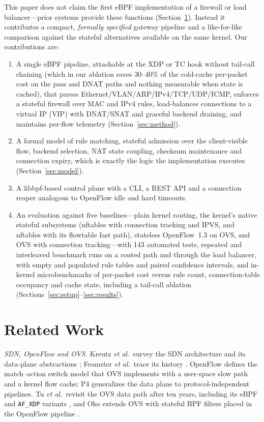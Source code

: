 \documentclass[conference]{IEEEtran}
\begin{document}
This paper does not claim the first eBPF implementation of a firewall or load
balancer---prior systems provide these functions (Section~\ref{sec:related}). Instead it
contributes a compact, \emph{formally specified} gateway pipeline and a
like-for-like comparison against the stateful alternatives available on the
same kernel. Our contributions are:
\begin{enumerate}
\item A single eBPF pipeline, attachable at the XDP or TC hook without
tail-call chaining (which in our ablation saves 30--40\% of the cold-cache
per-packet cost on the pass and DNAT paths and nothing measurable when state
is cached), that parses Ethernet/VLAN/ARP/IPv4/TCP/UDP/ICMP, enforces
a stateful firewall over MAC and IPv4 rules, load-balances connections to a
virtual IP (VIP) with DNAT/SNAT and graceful backend draining, and maintains
per-flow telemetry (Section~\ref{sec:method}).
\item A formal model of rule matching, stateful admission over the
client-visible flow, backend selection, NAT state coupling, checksum
maintenance and connection expiry, which is exactly the logic the
implementation executes (Section~\ref{sec:model}).
\item A libbpf-based control plane with a CLI, a REST API and a connection
reaper analogous to OpenFlow idle and hard timeouts.
\item An evaluation against five baselines---plain kernel routing, the
kernel's native stateful subsystems (nftables with connection tracking and
IPVS, and nftables with its flowtable fast path), stateless OpenFlow~1.3 on
OVS, and OVS with connection tracking---with 143 automated tests, repeated
and interleaved benchmark runs on a routed path and through the load
balancer, with empty and populated rule tables and paired confidence
intervals, and in-kernel
microbenchmarks of per-packet cost versus rule count, connection-table
occupancy and cache state, including a tail-call ablation (Sections~\ref{sec:setup}--\ref{sec:results}).
\end{enumerate}

\section{Related Work}
\label{sec:related}
\textit{SDN, OpenFlow and OVS.} Kreutz \textit{et al.}\ survey the SDN
architecture and its data-plane abstractions \cite{kreutz2015sdn}; Feamster
\textit{et al.}\ trace its history \cite{feamster2014road}. OpenFlow
\cite{mckeown2008openflow} defines the match--action switch model that OVS
\cite{pfaff2015ovs} implements with a user-space slow path and a kernel flow
cache; P4 \cite{bosshart2014p4} generalizes the data plane to
protocol-independent pipelines. Tu \textit{et al.}\ revisit the OVS data path
after ten years, including its eBPF and \texttt{AF\_XDP} variants \cite{tu2021ovs}, and
Oko extends OVS with stateful BPF filters placed in the OpenFlow pipeline
\cite{chaignon2018oko}.
\end{document}
